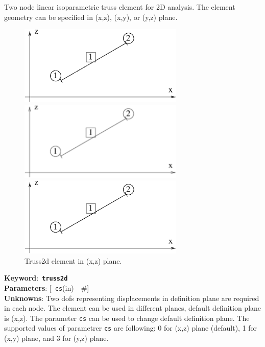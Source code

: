 \documentclass[a4paper]{article}
\newcommand{\descitem}[1]{{\noindent \bf #1}:}
\newcommand{\elemkeyword}[1]{\descitem{Keyword}~{\bf \texttt{#1}}}
\newcommand{\elemparam}[2]{{{\texttt{#1}\tiny (#2)}~~\#}}
\newcommand{\optelemparam}[2]{{[~\elemparam{#1}{#2}]}}
\newcommand{\param}[1]{{\texttt{#1}}}
\begin{document}
Two node linear isoparametric truss element for 2D analysis. The
element geometry can be specified in (x,z), (x,y), or (y,z) plane. 
\begin{figure}[tb]
\begin{htmlonly}
  \centerline{\includegraphics[width=0.7\textwidth]{truss2d.eps}}
\end{htmlonly}
\ifpdf
\centerline{\includegraphics[width=0.7\textwidth]{truss2d.pdf}}
\else
\centerline{\includegraphics[width=0.7\textwidth]{truss2d.eps}}
\fi
\caption{Truss2d element in (x,z) plane.}
\end{figure}

\elemkeyword{truss2d}\\
\descitem{Parameters} \optelemparam{cs}{in}\\

\descitem{Unknowns}
Two dofs representing displacements in definition plane are required
in each node. The element can be used in different planes, default
definition plane is (x,z). The parameter \param{cs} can be used to
change default definition plane. The supported values of parametrer
\param{cs} are following: 0 for (x,z) plane (default), 1 for (x,y)
plane, and 3 for (y,z) plane.
\end{document}
